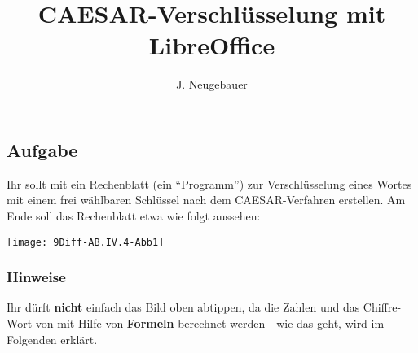 \documentclass[10pt, a4paper]{scrartcl}
\author{J. Neugebauer}
\title{CAESAR-Verschlüsselung mit LibreOffice}
\date{\Heute}
\begin{document}
\ReiheTitel

\subsection*{Aufgabe}
Ihr sollt mit  ein Rechenblatt (ein \enquote{Programm}) zur Verschlüsselung eines Wortes mit einem frei wählbaren Schlüssel nach dem CAESAR-Verfahren erstellen. Am Ende soll das Rechenblatt etwa wie folgt aussehen:

\begin{center}
\texttt{[image: 9Diff-AB.IV.4-Abb1]}
\end{center}

\subsubsection*{Hinweise}
Ihr dürft \textbf{nicht} einfach das Bild oben abtippen, da die Zahlen und das Chiffre-Wort von  mit Hilfe von \textbf{Formeln} berechnet werden - wie das geht, wird im Folgenden erklärt.
\end{document}
